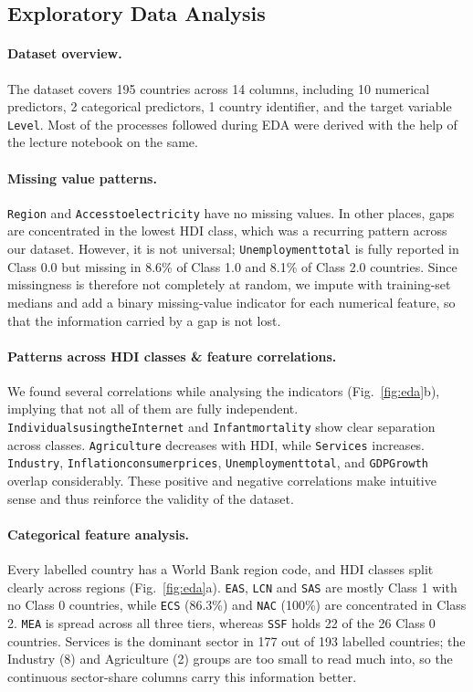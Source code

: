 \documentclass[10pt,a4paper]{article}
\renewcommand{\_}{\oldus\allowbreak}
\begin{document}
\subsection{Exploratory Data Analysis}
\label{sec:eda}

\paragraph{Dataset overview.} The dataset covers 195 countries across 14
columns, including 10 numerical predictors, 2 categorical predictors, 1
country identifier, and the target variable \texttt{Level}. Most of the
processes followed during EDA were derived with the help of the lecture
notebook on the same.

\paragraph{Missing value patterns.} \texttt{Region} and
\texttt{Access\_to\_electricity} have no missing values. In other places, gaps are
concentrated in the lowest HDI class, which was a recurring pattern across
our dataset. However, it is not universal; \texttt{Unemployment\_total} is
fully reported in Class 0.0 but missing in 8.6\% of Class 1.0 and 8.1\% of
Class 2.0 countries. Since missingness is therefore not completely at random,
we impute with training-set medians and add a binary missing-value indicator
for each numerical feature, so that the information carried by a gap is not
lost.

\paragraph{Patterns across HDI classes \& feature correlations.} We found
several correlations while analysing the indicators (Fig.~\ref{fig:eda}b),
implying that not all of them are fully independent.
\texttt{Individuals\_using\_the\_Internet} and \texttt{Infant\_mortality}
show clear separation across classes. \texttt{Agriculture} decreases with
HDI, while \texttt{Services} increases. \texttt{Industry},
\texttt{Inflation\_consumer\_prices}, \texttt{Unemployment\_total}, and
\texttt{GDP\_Growth} overlap considerably. These positive and negative
correlations make intuitive sense and thus reinforce the validity of the
dataset.

\paragraph{Categorical feature analysis.} Every labelled country has a World
Bank region code, and HDI classes split clearly across regions
(Fig.~\ref{fig:eda}a). \texttt{EAS}, \texttt{LCN} and \texttt{SAS} are mostly
Class 1 with no Class 0 countries, while \texttt{ECS} (86.3\%) and
\texttt{NAC} (100\%) are concentrated in Class 2. \texttt{MEA} is spread
across all three tiers, whereas \texttt{SSF} holds 22 of the 26 Class 0
countries. Services is the dominant sector in 177 out of 193 labelled
countries; the Industry (8) and Agriculture (2) groups are too small to read
much into, so the continuous sector-share columns carry this information
better.
\end{document}
